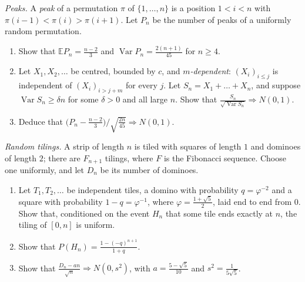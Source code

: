 \begin{exercise}[$\star\star$]\label{pb:peaks}
\emph{Peaks.} A \emph{peak} of a permutation $\pi$ of $\{1,\dots,n\}$ is a position $1<i<n$ with $\pi(i-1)<\pi(i)>\pi(i+1)$. Let $P_n$ be the number of peaks of a
uniformly random permutation.
\begin{enumerate}[label=(\alph*)]
\item Show that $\mathbb EP_n=\frac{n-2}3$ and $\operatorname{Var}P_n=\frac{2(n+1)}{45}$ for $n\ge4$.
\item Let $X_1,X_2,\dots$ be centred, bounded by $c$, and \emph{$m$-dependent}: $(X_i)_{i\le j}$ is independent of $(X_i)_{i>j+m}$ for every $j$. Let
$S_n=X_1+\dots+X_n$, and suppose $\operatorname{Var}S_n\ge\delta n$ for some $\delta>0$ and all large $n$. Show that $\frac{S_n}{\sqrt{\operatorname{Var}S_n}}\Rightarrow N(0,1)$.
\item Deduce that $\bigl(P_n-\frac{n-2}3\bigr)\big/\sqrt{\frac{2n}{45}}\Rightarrow N(0,1)$.
\end{enumerate}
\end{exercise}

\begin{exercise}[$\star\star$]\label{pb:tilings}
\emph{Random tilings.} A strip of length $n$ is tiled with squares of length $1$ and dominoes of length $2$; there are $F_{n+1}$ tilings, where $F$ is the
Fibonacci sequence. Choose one uniformly, and let $D_n$ be its number of dominoes.
\begin{enumerate}[label=(\alph*)]
\item Let $T_1,T_2,\dots$ be independent tiles, a domino with probability $q=\varphi^{-2}$ and a square with probability $1-q=\varphi^{-1}$, where
$\varphi=\frac{1+\sqrt5}2$, laid end to end from $0$. Show that, conditioned on the event $H_n$ that some tile ends exactly at $n$, the tiling of $[0,n]$ is uniform.
\item Show that $P(H_n)=\frac{1-(-q)^{n+1}}{1+q}$.
\item Show that $\frac{D_n-an}{\sqrt n}\Rightarrow N(0,s^2)$, with $a=\frac{5-\sqrt5}{10}$ and $s^2=\frac1{5\sqrt5}$.
\end{enumerate}
\end{exercise}

